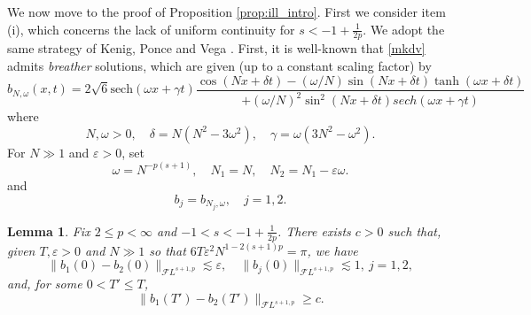 \documentclass[a4paper,
11pt,  reqno]{amsart}
\newcommand{\5}{\textup{V}}
\newcommand{\sech}{\text{sech}}
\newcommand{\FL}{\mathcal{F} L}
\newcommand{\eps}{\varepsilon}
\newtheorem{lemma}[theorem]{Lemma}
\theoremstyle{remark}
\numberwithin{equation}{section}
\numberwithin{theorem}{section}
\begin{document}
We now move to the proof of Proposition  \ref{prop:ill_intro}.
First we consider item (i), which concerns the lack of uniform continuity for $s<-1+\frac1{2p}$. 
We adopt the same strategy of Kenig, Ponce and Vega \cite{KPV_ill}. First, it is well-known that  \eqref{mkdv}
 admits \emph{breather} solutions, which are given (up to a constant scaling factor) by
$$
b_{N,\omega}(x,t)=2\sqrt{6}\sech(\omega x +\gamma t)\frac{\cos(Nx+\delta t)-(\omega/N)\sin(Nx+\delta t)\tanh(\omega x+\delta t)}{+(\omega/N)^2\sin^2(Nx+\delta t)sech(\omega x + \gamma t)}
$$
where
$$
N,\omega>0,\quad \delta=N(N^2-3\omega^2),\quad \gamma=\omega (3N^2-\omega^2).
$$
For $N\gg 1$ and $\eps>0$, set
$$
\omega=N^{-p(s+1)},\quad N_1=N,\quad N_2=N_1-\eps\omega.
$$ 
and
$$
b_j=b_{N_j,\omega},\quad j=1,2.
$$
\begin{lemma}\label{lem:breather}Fix $2\le p < \infty$ and $-1<s<-1+\frac1{2p}$. There exists $c>0$ such that, given  $T, \eps>0$ and $N\gg 1$ so that $6T\eps^2N^{1-2(s+1)p} = \pi$, we have
\begin{equation}\label{eq:breathers1}
	\|b_1(0)-b_2(0)\|_{\FL^{s+1,p}}\lesssim \eps, \quad \|b_j(0)\|_{\FL^{s+1,p}} \lesssim 1,\ j=1,2,
\end{equation}
and, for some $0<T'\le T$,
\begin{equation}\label{eq:breathers2}
	\|b_1(T')-b_2(T')\|_{\FL^{s+1,p}}\ge c.
\end{equation}
\end{lemma}
\end{document}
